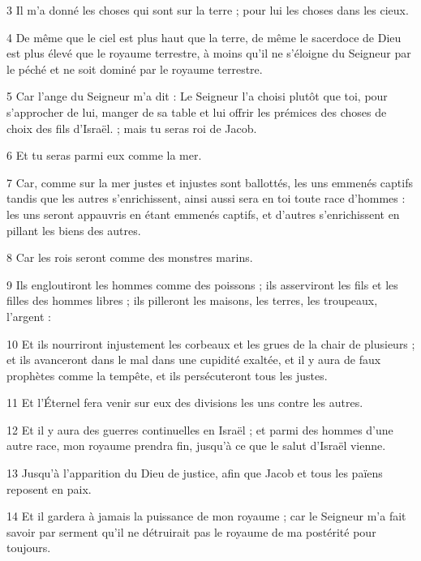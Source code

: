 \par 3 Il m'a donné les choses qui sont sur la terre ; pour lui les choses dans les cieux.

\par 4 De même que le ciel est plus haut que la terre, de même le sacerdoce de Dieu est plus élevé que le royaume terrestre, à moins qu'il ne s'éloigne du Seigneur par le péché et ne soit dominé par le royaume terrestre.

\par 5 Car l'ange du Seigneur m'a dit : Le Seigneur l'a choisi plutôt que toi, pour s'approcher de lui, manger de sa table et lui offrir les prémices des choses de choix des fils d'Israël. ; mais tu seras roi de Jacob.

\par 6 Et tu seras parmi eux comme la mer.

\par 7 Car, comme sur la mer justes et injustes sont ballottés, les uns emmenés captifs tandis que les autres s'enrichissent, ainsi aussi sera en toi toute race d'hommes : les uns seront appauvris en étant emmenés captifs, et d'autres s'enrichissent en pillant les biens des autres.

\par 8 Car les rois seront comme des monstres marins.

\par 9 Ils engloutiront les hommes comme des poissons ; ils asserviront les fils et les filles des hommes libres ; ils pilleront les maisons, les terres, les troupeaux, l'argent :

\par 10 Et ils nourriront injustement les corbeaux et les grues de la chair de plusieurs ; et ils avanceront dans le mal dans une cupidité exaltée, et il y aura de faux prophètes comme la tempête, et ils persécuteront tous les justes.

\par 11 Et l'Éternel fera venir sur eux des divisions les uns contre les autres.

\par 12 Et il y aura des guerres continuelles en Israël ; et parmi des hommes d'une autre race, mon royaume prendra fin, jusqu'à ce que le salut d'Israël vienne.

\par 13 Jusqu'à l'apparition du Dieu de justice, afin que Jacob et tous les païens reposent en paix.

\par 14 Et il gardera à jamais la puissance de mon royaume ; car le Seigneur m'a fait savoir par serment qu'il ne détruirait pas le royaume de ma postérité pour toujours.

